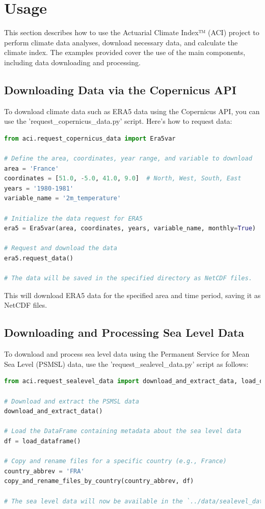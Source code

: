 \documentclass[a4paper,12pt]{article}
\begin{document}
\section{Usage}
\label{sec:usage}

This section describes how to use the Actuarial Climate Index™ (ACI) project to perform climate data analyses, download necessary data, and calculate the climate index. The examples provided cover the use of the main components, including data downloading and processing.

\subsection{Downloading Data via the Copernicus API}

To download climate data such as ERA5 data using the Copernicus API, you can use the 'request\_copernicus\_data.py' script. Here’s how to request data:

\begin{lstlisting}[language=python]
from aci.request_copernicus_data import Era5var

# Define the area, coordinates, year range, and variable to download
area = 'France'
coordinates = [51.0, -5.0, 41.0, 9.0]  # North, West, South, East
years = '1980-1981'
variable_name = '2m_temperature'

# Initialize the data request for ERA5
era5 = Era5var(area, coordinates, years, variable_name, monthly=True)

# Request and download the data
era5.request_data()

# The data will be saved in the specified directory as NetCDF files.
\end{lstlisting}

This will download ERA5 data for the specified area and time period, saving it as NetCDF files.

\subsection{Downloading and Processing Sea Level Data}

To download and process sea level data using the Permanent Service for Mean Sea Level (PSMSL) data, use the 'request\_sealevel\_data.py' script as follows:

\begin{lstlisting}[language=python]
from aci.request_sealevel_data import download_and_extract_data, load_dataframe, copy_and_rename_files_by_country

# Download and extract the PSMSL data
download_and_extract_data()

# Load the DataFrame containing metadata about the sea level data
df = load_dataframe()

# Copy and rename files for a specific country (e.g., France)
country_abbrev = 'FRA'
copy_and_rename_files_by_country(country_abbrev, df)

# The sea level data will now be available in the `../data/sealevel_data_FRA/` directory.
\end{lstlisting}
\end{document}
